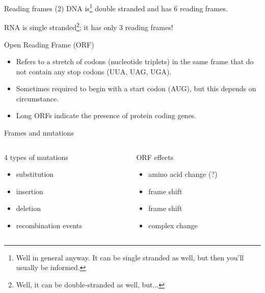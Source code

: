 \documentclass[pdf]{beamer}
\begin{document}
\begin{frame}{Reading frames (2)}
  DNA is\footnote{Well in general anyway. It can be single stranded as well,
    but then you'll usually be informed.}
  double stranded and has 6 reading frames.
  \vspace{3ex}

  RNA is single stranded\footnote{Well, it can be double-stranded as well, but...}; it has only 3 reading frames!
\end{frame}

\begin{frame}{Open Reading Frame (ORF)}
  \begin{itemize}
    \item Refers to a stretch of codons (nucleotide triplets) in the same frame that
      do not contain any stop codons (UUA, UAG, UGA).
    \item Sometimes required to begin with a start codon (AUG), but this depends on circumstance.
    \item Long ORFs indicate the presence of protein coding genes.
  \end{itemize}
\end{frame}

\begin{frame}{Frames and mutations}
    \begin{columns}
      \begin{column}{0.5\textwidth}
        4 types of mutations
        \begin{itemize}
          \item substitution
          \item insertion
          \item deletion
          \item recombination events
        \end{itemize}
      \end{column}
      \begin{column}{0.5\textwidth}
        ORF effects
        \begin{itemize}
          \item amino acid change (?)
          \item frame shift
          \item frame shift
          \item complex change
        \end{itemize}
      \end{column}
    \end{columns}
\end{frame}
\end{document}
